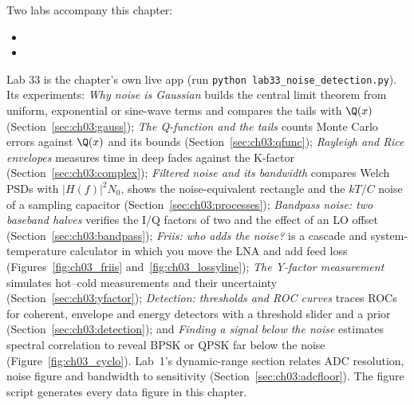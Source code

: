 \begin{labbox}
Two labs accompany this chapter:
\begin{itemize}
\item {}
\item {}
\end{itemize}
Lab 33 is the chapter's own live app (run \texttt{python lab33\_noise\_detection.py}). Its experiments:
\emph{Why noise is Gaussian} builds the central limit theorem from uniform, exponential or sine-wave terms and
compares the tails with $\Q(x)$ (Section~\ref{sec:ch03:gauss}); \emph{The Q-function and the tails} counts
Monte Carlo errors against $\Q(x)$ and its bounds (Section~\ref{sec:ch03:qfunc}); \emph{Rayleigh and Rice
envelopes} measures time in deep fades against the K-factor (Section~\ref{sec:ch03:complex}); \emph{Filtered
noise and its bandwidth} compares Welch PSDs with $|H(f)|^2N_0$, shows the noise-equivalent rectangle and the
$kT/C$ noise of a sampling capacitor (Section~\ref{sec:ch03:processes}); \emph{Bandpass noise: two baseband
halves} verifies the I/Q factors of two and the effect of an LO offset (Section~\ref{sec:ch03:bandpass});
\emph{Friis: who adds the noise?} is a cascade and system-temperature calculator in which you move the LNA
and add feed loss (Figures~\ref{fig:ch03_friis} and~\ref{fig:ch03_lossyline}); \emph{The Y-factor
measurement} simulates hot--cold measurements and their uncertainty (Section~\ref{sec:ch03:yfactor});
\emph{Detection: thresholds and ROC curves} traces ROCs for coherent, envelope and energy detectors with a
threshold slider and a prior (Section~\ref{sec:ch03:detection}); and \emph{Finding a signal below the noise}
estimates spectral correlation to reveal BPSK or QPSK far below the noise (Figure~\ref{fig:ch03_cyclo}). Lab~1's
dynamic-range section relates ADC resolution, noise figure and bandwidth to sensitivity
(Section~\ref{sec:ch03:adcfloor}). The figure script  generates every data
figure in this chapter.
\end{labbox}

